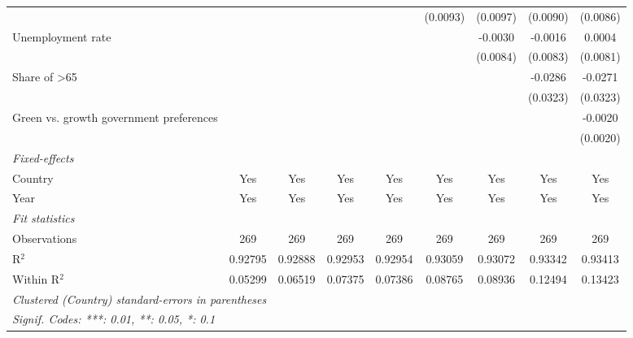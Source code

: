 \begin{table}[htbp]
\begin{tabular}{lcccccccc}
                                                               &               &               &          &          & (0.0093)     & (0.0097)     & (0.0090)      & (0.0086)\\   
      Unemployment rate                                        &               &               &          &          &              & -0.0030      & -0.0016       & 0.0004\\   
                                                               &               &               &          &          &              & (0.0084)     & (0.0083)      & (0.0081)\\   
      Share of >65                                             &               &               &          &          &              &              & -0.0286       & -0.0271\\   
                                                               &               &               &          &          &              &              & (0.0323)      & (0.0323)\\   
      Green vs. growth government preferences                  &               &               &          &          &              &              &               & -0.0020\\   
                                                               &               &               &          &          &              &              &               & (0.0020)\\   
      \midrule
      \emph{Fixed-effects}\\
      Country                                                  & Yes           & Yes           & Yes      & Yes      & Yes          & Yes          & Yes           & Yes\\  
      Year                                                     & Yes           & Yes           & Yes      & Yes      & Yes          & Yes          & Yes           & Yes\\  
      \midrule
      \emph{Fit statistics}\\
      Observations                                             & 269           & 269           & 269      & 269      & 269          & 269          & 269           & 269\\  
      R$^2$                                                    & 0.92795       & 0.92888       & 0.92953  & 0.92954  & 0.93059      & 0.93072      & 0.93342       & 0.93413\\  
      Within R$^2$                                             & 0.05299       & 0.06519       & 0.07375  & 0.07386  & 0.08765      & 0.08936      & 0.12494       & 0.13423\\  
      \midrule \midrule
      \multicolumn{9}{l}{\emph{Clustered (Country) standard-errors in parentheses}}\\
      \multicolumn{9}{l}{\emph{Signif. Codes: ***: 0.01, **: 0.05, *: 0.1}}\\
   \end{tabular}
\end{table}


